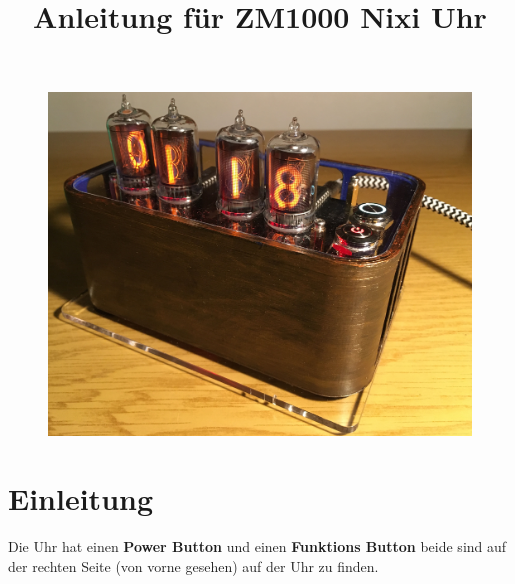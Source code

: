 \documentclass[a4paper,12pt]{article}
\title{Anleitung für ZM1000 Nixi Uhr}
\begin{document}
\maketitle

\begin{figure}[h!]
    \centering
    \includegraphics[width=1\textwidth]{Clock.jpg}
\end{figure}

\newpage

\section{Einleitung}

Die Uhr hat einen \textbf{Power Button} und einen \textbf{Funktions Button} beide sind auf der rechten Seite (von vorne gesehen) auf der Uhr zu finden.
\end{document}
